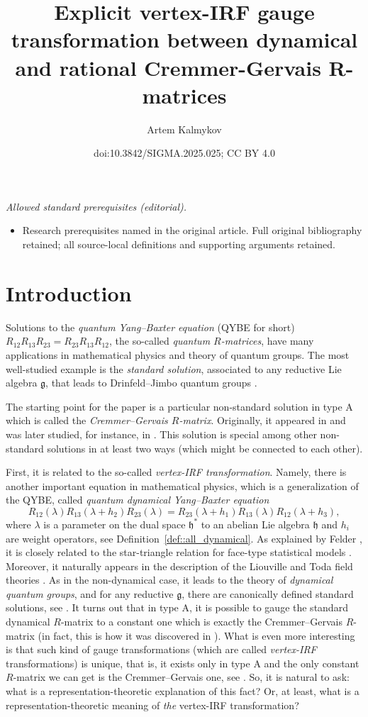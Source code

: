 \documentclass[10pt,a4paper]{amsart}
\title{Explicit vertex-IRF gauge transformation between dynamical and rational Cremmer-Gervais R-matrices}
\author{Artem Kalmykov}
\date{doi:10.3842/SIGMA.2025.025; CC BY 4.0}
\numberwithin{equation}{section}
\newcommand{\g}{\mathfrak{g}}
\newcommand{\h}{\mathfrak{h}}
\begin{document}
\maketitle
\noindent\textit{Allowed standard prerequisites (editorial).}\begin{itemize}
\item Research prerequisites named in the original article. Full original bibliography retained; all source-local definitions and supporting arguments retained.
\end{itemize}\medskip
\section{Introduction}
	
Solutions to the \emph{quantum Yang--Baxter equation} (QYBE for short)
$R_{12} R_{13} R_{23} = R_{23} R_{13} R_{12}$,
	the so-called \emph{quantum $R$-matrices}, have many applications in mathematical physics and theory of quantum groups. The most well-studied example is the \emph{standard solution}, associated to any reductive Lie algebra $\g$, that leads to Drinfeld--Jimbo quantum groups \cite{DrinfeldICM,Jimbo}.
	
The starting point for the paper is a particular non-standard solution in type A which is called the \emph{Cremmer--Gervais $R$-matrix}. Originally, it appeared in \cite{CremmerGervais} and was later studied, for instance, in \cite{BuffenoirRocheTerras,Hodges}. This solution is special among other non-standard solutions in at least two ways (which might be connected to each other).
	
First, it is related to the so-called \emph{vertex-IRF transformation}. Namely, there is another important equation in mathematical physics, which is a generalization of the QYBE, called \emph{quantum dynamical Yang--Baxter equation}
	\[
	R_{12}(\lambda) R_{13}(\lambda+h_2) R_{23} (\lambda)= R_{23}(\lambda + h_1) R_{13}(\lambda) R_{12}(\lambda + h_3),
	\]
	where $\lambda$ is a parameter on the dual space $\h^*$ to an abelian Lie algebra $\h$ and $h_i$ are weight operators, see Definition~\ref{def::all_dynamical}. As explained by Felder \cite{Felder}, it is closely related to the star-triangle relation for face-type statistical models \cite{Baxter}. Moreover, it naturally appears in the description of the Liouville and Toda field theories \cite{GervaisNeveu}. As in the non-dynamical case, it leads to the theory of \emph{dynamical quantum groups}, and for any reductive $\g$, there are canonically defined standard solutions, see \cite{EtingofICM,EtingofSchiffmann}. It turns out that in type A, it is possible to gauge the standard dynamical $R$-matrix to a constant one which is exactly the Cremmer--Gervais $R$-matrix (in fact, this is how it was discovered in \cite{CremmerGervais}). What is even more interesting is that such kind of gauge transformations (which are called \emph{vertex-IRF} transformations) is unique, that is, it exists only in type A and the only constant $R$-matrix we can get is the Cremmer--Gervais one, see \cite{BalogDabrowskiFeher}. So, it is natural to ask: what is a representation-theoretic explanation of this fact? Or, at least, what is a representation-theoretic meaning of \emph{the} vertex-IRF transformation?
	
\end{document}
